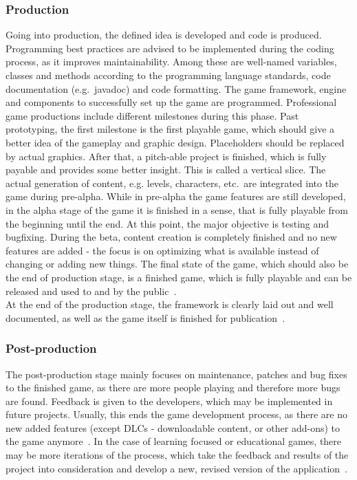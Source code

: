 \subsubsection{Production}\label{subsubsec:production}
Going into production, the defined idea is developed and code is produced.
Programming best practices are advised to be implemented during the coding process, as it improves maintainability.
Among these are well-named variables, classes and methods according to the programming language standards, code documentation (e.g.\ javadoc) and code formatting.
The game framework, engine and components to successfully set up the game are programmed.
Professional game productions include different milestones during this phase.
Past prototyping, the first milestone is the first playable game, which should give a better idea of the gameplay and graphic design.
Placeholders should be replaced by actual graphics.
After that, a pitch-able project is finished, which is fully payable and provides some better insight.
This is called a vertical slice.
The actual generation of content, e.g. levels, characters, etc.\ are integrated into the game during
pre-alpha.
While in pre-alpha the game features are still developed, in the alpha stage of the game it is finished in a sense, that is fully playable from the beginning
until the end.
At this point, the major objective is testing and bugfixing.
During the beta, content creation is completely finished and no new features are added - the focus is on optimizing what is available instead of
changing or adding new things.
The final state of the game, which should also be the end of production stage, is a finished game, which is fully playable and can be
released and used to and by the public~\cite{cg:game-design-stages}.
\\
At the end of the production stage, the framework is clearly laid out and well documented, as well as the game itself is finished for publication~\cite{GAMED}.

\subsubsection{Post-production}\label{subsubsec:post-production}
The post-production stage mainly focuses on maintenance, patches and bug fixes to the finished game, as there are more people playing and therefore more bugs
are found.
Feedback is given to the developers, which may be implemented in future projects.
Usually, this ends the game development process, as there are no new added features (except DLCs - downloadable content, or other add-ons) to the game anymore~\cite{cg:game-design-stages}.
In the case of learning focused or educational games, there may be more iterations of the process, which take the feedback and results of the project into
consideration and develop a new, revised version of the application~\cite{GAMED}.

